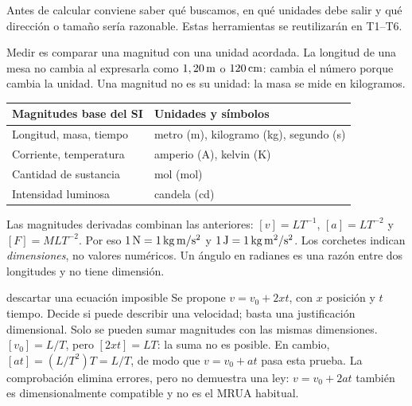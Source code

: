 \documentclass[11pt,a4paper]{article}
\begin{document}
\shorthandoff{<>}
\color{Ink}
Antes de calcular conviene saber qu\'e buscamos, en qu\'e unidades debe salir y qu\'e
direcci\'on o tama\~no ser\'ia razonable. Estas herramientas se reutilizar\'an en T1--T6.
\begin{lessonindex}
\end{lessonindex}

Medir es comparar una magnitud con una unidad acordada. La longitud de una mesa no
cambia al expresarla como $1,20\,\mathrm{m}$ o $120\,\mathrm{cm}$: cambia el n\'umero porque
cambia la unidad. Una magnitud no es su unidad: la masa se mide en kilogramos.
\begin{tabularx}{\linewidth}{@{}>{\raggedright\arraybackslash}p{4.6cm}Y@{}}
\toprule
Magnitudes base del SI & Unidades y s\'imbolos\\
\midrule
Longitud, masa, tiempo & metro (m), kilogramo (kg), segundo (s)\\
Corriente, temperatura & amperio (A), kelvin (K)\\
Cantidad de sustancia & mol (mol)\\
Intensidad luminosa & candela (cd)\\
\bottomrule
\end{tabularx}
Las magnitudes derivadas combinan las anteriores:
$[v]=LT^{-1}$, $[a]=LT^{-2}$ y $[F]=MLT^{-2}$.
Por eso $1\,\mathrm{N}=1\,\mathrm{kg\,m/s^2}$ y $1\,\mathrm{J}=1\,\mathrm{kg\,m^2/s^2}$.
Los corchetes indican \emph{dimensiones}, no valores num\'ericos.
Un \'angulo en radianes es una raz\'on entre dos longitudes y no tiene dimensi\'on.

\begin{examplebox}{descartar una ecuaci\'on imposible}
 Se propone $v=v_0+2xt$, con $x$ posici\'on y $t$ tiempo.
Decide si puede describir una velocidad; basta una justificaci\'on dimensional.
\solutionblock
{} Solo se pueden sumar magnitudes con las mismas dimensiones.
 $[v_0]=L/T$, pero $[2xt]=LT$: la suma no es posible.
En cambio, $[at]=(L/T^2)T=L/T$, de modo que $v=v_0+at$ pasa esta prueba.
 La comprobaci\'on elimina errores, pero no demuestra una ley:
$v=v_0+2at$ tambi\'en es dimensionalmente compatible y no es el MRUA habitual.
\end{examplebox}
\end{document}
